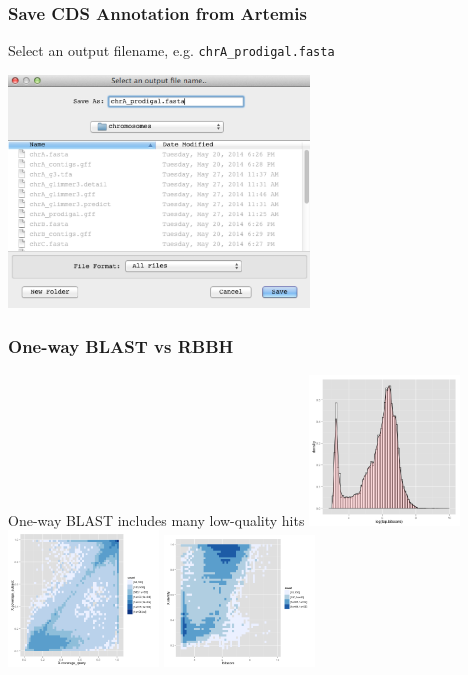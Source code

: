 \documentclass[table]{beamer}
\begin{document}
    \begin{frame}
      \frametitle{Save CDS Annotation from Artemis}   
      Select an output filename, e.g. \texttt{chrA\_prodigal.fasta}
      \begin{center}
        \includegraphics[width=0.6\textwidth]{images/export3}     
      \end{center}        
    \end{frame}

    \begin{frame}
      \frametitle{One-way BLAST vs RBBH}   
      One-way BLAST includes many low-quality hits
        \includegraphics[width=0.3\textwidth]{images/rbbh1}  
        \includegraphics[width=0.3\textwidth]{images/rbbh2}  
        \includegraphics[width=0.3\textwidth]{images/rbbh3}                        
    \end{frame}
\end{document}
